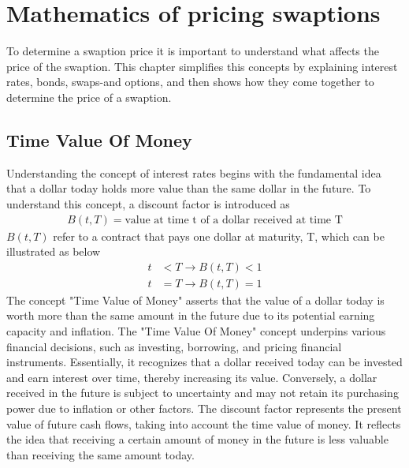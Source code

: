 \section{Mathematics of pricing swaptions}
To determine a swaption price it is important to understand what affects the price of the swaption. 
This chapter simplifies this concepts by explaining interest rates, bonds, swaps-and options, 
and then shows how they come together to determine the price of a swaption.
\subsection{Time Value Of Money}
Understanding the concept of interest rates begins with the fundamental idea that a dollar today holds 
more value than the same dollar in the future. To understand this concept, a discount factor is introduced as 
\begin{align*}
    B(t,T) = \text{value at time t of a dollar received at time T}
\end{align*} 
$B(t,T)$ refer to a contract that pays one dollar at maturity, T, which can be illustrated as below
\begin{align*}
    t & < T \rightarrow B(t,T) < 1 \\
    t & = T \rightarrow B(t,T) = 1
\end{align*}
The concept "Time Value of Money" asserts that the value of a dollar today is worth more than
the same amount in the future due to its potential earning capacity and inflation.
The "Time Value Of Money" concept underpins various financial decisions, such as investing, borrowing,
and pricing financial instruments. Essentially, it recognizes that a dollar received today can be invested 
and earn interest over time, thereby increasing its value. Conversely, a dollar received in the future
is subject to uncertainty and may not retain its purchasing power due to inflation or other factors.
The discount factor represents the present value of future cash flows, taking into account the time value of money.
It reflects the idea that receiving a certain amount of money in the future is less valuable than receiving 
the same amount today.
